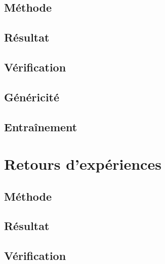 \subsection{Méthode}\label{boucles:informatique:methode}

\subsection{Résultat}\label{boucles:informatique:resultat}

\subsection{Vérification}\label{boucles:informatique:verification}

\subsection{Généricité}\label{boucles:informatique:genericite}

\subsection{Entraînement}\label{boucles:informatique:entrainement}


\section{Retours d'expériences}\label{boucles:retours}

\subsection{Méthode}\label{boucles:retours:methode}

\subsection{Résultat}\label{boucles:retours:resultat}

\subsection{Vérification}\label{boucles:retours:verification}

